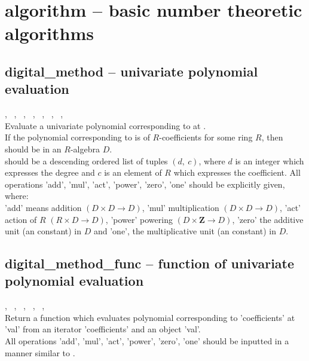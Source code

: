 

 \section{algorithm -- basic number theoretic algorithms}
%
  \subsection{digital\_method -- univariate polynomial evaluation}
   {%
     ,\ %
     ,\ %
     ,\ %
     ,\ %
     ,\ %
     ,\ %
     ,\ %
   }{%
   }\\
   \spacing
   \quad Evaluate a univariate polynomial corresponding to  at .\\
   \spacing
   \quad  If the polynomial corresponding to  is of $R$-coefficients for some ring $R$, 
   then  should be in an $R$-algebra $D$.\\
    should be a descending ordered list of tuples $(d,\ c)$, 
   where $d$ is an integer which expresses the degree and $c$ is an element of $R$ which expresses the coefficient. 
   All operations 'add', 'mul', 'act', 'power', 'zero', 'one' should be explicitly given, where:\\
      'add' means addition $(D \times D \to D)$,
      'mul' multiplication $(D \times D \to D)$,
      'act' action of $R$ $(R \times D \to D)$,
      'power' powering $(D \times \mathbf{Z} \to D)$,
      'zero' the additive unit (an constant) in $D$ and
      'one', the multiplicative unit (an constant) in $D$.
%
  \subsection{digital\_method\_func -- function of univariate polynomial evaluation}
   {%
     ,\ %
     ,\ %
     ,\ %
     ,\ %
     ,\ %
   }{%
   }\\
   \spacing
   \quad Return a function which evaluates polynomial corresponding to 'coefficients' at 'val' 
from an iterator 'coefficients' and an object 'val'.\\
   \spacing
   \quad  All operations 'add', 'mul', 'act', 'power', 'zero', 'one' should be inputted 
   in a manner similar to .\\
%
